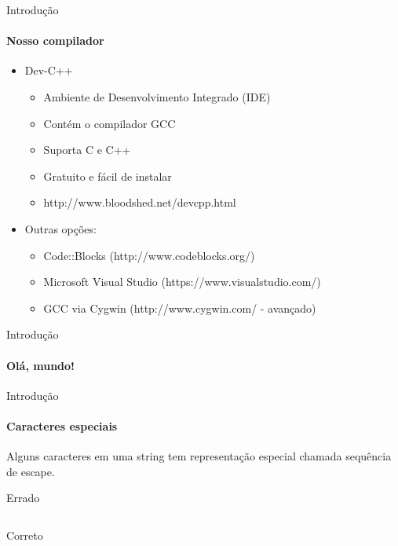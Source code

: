 \documentclass{beamer}
\begin{document}
  \begin{frame}{Introdução}
  	\framesubtitle{Nosso compilador}
  	\begin{itemize}
  		\item Dev-C++
  		\begin{itemize}
  			\item Ambiente de Desenvolvimento Integrado (IDE)
  			\item Contém o compilador GCC
  			\item Suporta C e C++
  			\item Gratuito e fácil de instalar
  			\item http://www.bloodshed.net/devcpp.html
  		\end{itemize}
  		\item Outras opções:
		\begin{itemize}
			\item Code::Blocks (http://www.codeblocks.org/)
			\item Microsoft Visual Studio (https://www.visualstudio.com/)
			\item GCC via Cygwin (http://www.cygwin.com/ - avançado)
		\end{itemize}
  	\end{itemize}
  \end{frame}
\begin{frame}[fragile]{Introdução}
 	\framesubtitle{Olá, mundo!}
\end{frame}
\begin{frame}[fragile]{Introdução}
	\framesubtitle{Caracteres especiais}
	Alguns caracteres em uma string tem representação especial chamada \alert{sequência de escape}.
	
	\begin{exampleblock}{Errado}
		\inputminted{c}{resources/linebreakwrong.c}
	\end{exampleblock}
	\begin{exampleblock}{Correto}
		\inputminted{c}{resources/linebreakcorrect.c}
	\end{exampleblock}
\end{frame}
\end{document}
